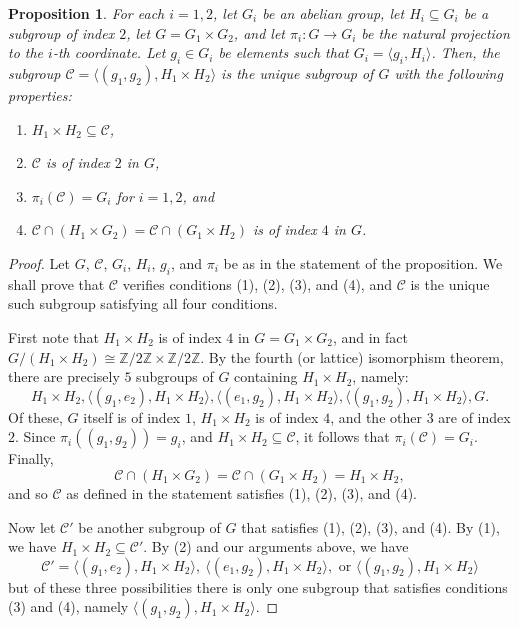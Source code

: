 \documentclass[11pt]{amsart}
\newtheorem{prop}[defn]{Proposition}
\theoremstyle{definition}
\newcommand{\Z}{\mathbb{Z}}
\newcommand{\cC}{\mathcal{C}}
\begin{document}
\begin{prop}\label{prop-grouptheoryentanglement}
    For each $i=1,2$, let $G_i$ be an abelian group, let $H_i\subseteq G_i$ be a subgroup of index $2$, let $G=G_1\times G_2$, and let $\pi_i\colon G\to G_i$ be the natural projection to the $i$-th coordinate. Let $g_i\in G_i$ be elements such that $G_i=\langle g_i, H_i\rangle$. Then, the subgroup $\cC=\langle (g_1,g_2),H_1\times H_2\rangle$ is the unique subgroup of $G$ with the following properties:
    \begin{enumerate}
        \item $H_1\times H_2 \subseteq \cC$,
        \item $\cC$ is of index $2$ in $G$,
        \item $\pi_i(\cC)=G_i$ for $i=1,2$, and
        \item $\cC\cap (H_1\times G_2) = \cC\cap (G_1\times H_2)$ is of index $4$ in $G$.
    \end{enumerate}
\end{prop}
\begin{proof}
    Let $G$, $\cC$, $G_i$, $H_i$, $g_i$, and $\pi_i$ be as in the statement of the proposition. We shall prove that $\cC$ verifies conditions (1), (2), (3), and (4), and $\cC$ is the unique such subgroup satisfying all four conditions.

    First note that $H_1\times H_2$ is of index $4$ in $G=G_1\times G_2$, and in fact $G/(H_1\times H_2)\cong \Z/2\Z \times \Z/2\Z$. By the fourth (or lattice) isomorphism theorem, there are precisely $5$ subgroups of $G$ containing $H_1\times H_2$, namely:
$$H_1\times H_2, \langle (g_1,e_2),H_1\times H_2\rangle, \langle (e_1,g_2),H_1\times H_2\rangle, \langle (g_1,g_2),H_1\times H_2\rangle, G.$$
Of these, $G$ itself is of index $1$, $H_1\times H_2$ is of index $4$, and the other $3$ are of index $2$. Since $\pi_i((g_1,g_2))=g_i$, and $H_1\times H_2\subseteq \cC$, it follows that $\pi_i(\cC)=G_i$. Finally,
$$\cC\cap (H_1\times G_2) = \cC\cap (G_1\times H_2)=H_1\times H_2,$$
and so $\cC$ as defined in the statement satisfies (1), (2), (3), and (4).

Now let $\cC'$ be another subgroup of $G$ that satisfies (1), (2), (3), and (4). By (1), we have $H_1\times H_2 \subseteq \cC'$. By (2) and our arguments above, we have 
$$\cC' = \langle (g_1,e_2),H_1\times H_2\rangle,\ \langle (e_1,g_2),H_1\times H_2\rangle, \text{ or } \langle (g_1,g_2),H_1\times H_2\rangle$$
but of these three possibilities there is only one subgroup that satisfies conditions (3) and (4), namely $\langle (g_1,g_2),H_1\times H_2\rangle$.
\end{proof}
\end{document}
